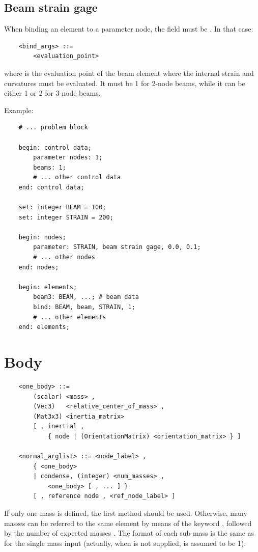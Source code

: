 \subsection{Beam strain gage}
When binding an element to a
parameter node, the  field must be .
In that case:
\begin{verbatim}
    <bind_args> ::=
        <evaluation_point>
\end{verbatim}
where  is the evaluation point of the beam element
where the internal strain and curvatures must be evaluated.
It must be 1 for 2-node beams, while it can be either 1 or 2
for 3-node beams.

Example:
\begin{verbatim}
    # ... problem block

    begin: control data;
        parameter nodes: 1;
        beams: 1;
        # ... other control data
    end: control data;

    set: integer BEAM = 100;
    set: integer STRAIN = 200;

    begin: nodes;
        parameter: STRAIN, beam strain gage, 0.0, 0.1;
        # ... other nodes
    end: nodes;

    begin: elements;
        beam3: BEAM, ...; # beam data
        bind: BEAM, beam, STRAIN, 1;
        # ... other elements
    end: elements;
\end{verbatim}



\section{Body}
\begin{verbatim}
    <one_body> ::=
        (scalar) <mass> , 
        (Vec3)   <relative_center_of_mass> ,
        (Mat3x3) <inertia_matrix>
        [ , inertial , 
            { node | (OrientationMatrix) <orientation_matrix> } ]

    <normal_arglist> ::= <node_label> ,
        { <one_body>
        | condense, (integer) <num_masses> ,
            <one_body> [ , ... ] }
        [ , reference node , <ref_node_label> ]
\end{verbatim}
If only one mass is defined, the first method should be used. Otherwise,
many masses can be referred to the same element by means of the keyword
, followed by the number of expected masses .
The format of each sub-mass is the same as for the single mass input (actually, 
when  is not supplied,  is assumed to be 1).

